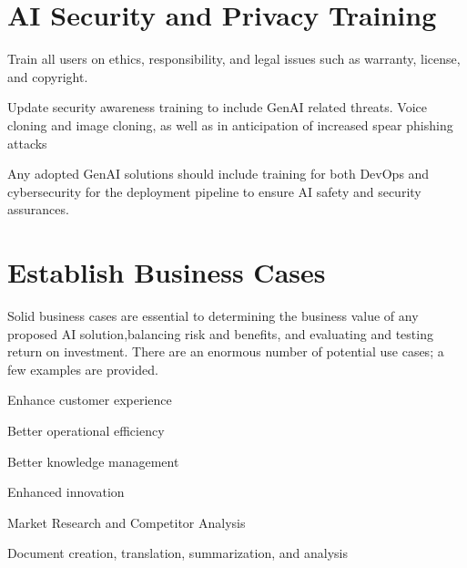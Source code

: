 \section{AI Security and Privacy Training}
\begin{minipage}{\linewidth}
\begin{checklist}
  \item Train all users on ethics, responsibility, and legal issues such as warranty, license, and copyright.
  \item Update security awareness training to include GenAI related threats. Voice cloning and image cloning, as well as in anticipation of increased spear phishing attacks
  \item Any adopted GenAI solutions should include training for both DevOps and cybersecurity for the deployment pipeline to ensure AI safety and security assurances.
\end{checklist}
\end{minipage}

\section{Establish Business Cases}
Solid business cases are essential to determining the business value of any
proposed AI solution,balancing risk and benefits, and evaluating and testing
return on investment. There are an enormous number of potential use cases; a
few examples are provided.
\begin{minipage}{\linewidth}
\begin{checklist}
  \item Enhance customer experience
  \item Better operational efficiency
  \item Better knowledge management
  \item Enhanced innovation
  \item Market Research and Competitor Analysis
  \item Document creation, translation, summarization, and analysis
\end{checklist}
\end{minipage}

